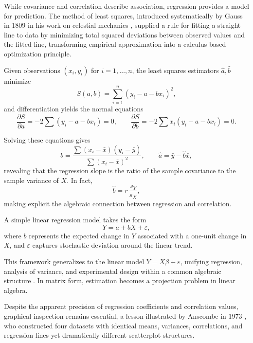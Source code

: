 \medskip

While covariance and correlation describe association, regression provides a model for prediction. The method of least squares, introduced systematically by Gauss in 1809 in his work on celestial mechanics \cite{gauss_1809_theoria}, supplied a rule for fitting a straight line to data by minimizing total squared deviations between observed values and the fitted line, transforming empirical approximation into a calculus-based optimization principle.

\medskip

Given observations \((x_i,y_i)\) for \(i=1,\dots,n\), the least squares estimators \(\hat{a},\hat{b}\) minimize 
\[
    S(a,b)=\sum_{i=1}^{n}(y_i-a-bx_i)^2,
\]
and differentiation yields the normal equations
\[
    \frac{\partial S}{\partial a}= -2\sum (y_i-a-bx_i)=0, \qquad \frac{\partial S}{\partial b}= -2\sum x_i(y_i-a-bx_i)=0.
\]

\medskip

Solving these equations gives
\[
    \hat{b}=\frac{\sum (x_i-\bar{x})(y_i-\bar{y})}{\sum (x_i-\bar{x})^2}, \qquad \hat{a}=\bar{y}-\hat{b}\bar{x},
\]
revealing that the regression slope is the ratio of the sample covariance to the sample variance of \(X\). In fact,
\[
    \hat{b}= r\,\frac{s_Y}{s_X},
\]
making explicit the algebraic connection between regression and correlation.

\medskip

A simple linear regression model takes the form
\[
Y = a + bX + \varepsilon,
\]
where \(b\) represents the expected change in \(Y\) associated with a one-unit change in \(X\), and \(\varepsilon\) captures stochastic deviation around the linear trend.

\medskip

This framework generalizes to the linear model \(Y = X\beta + \varepsilon\), unifying regression, analysis of variance, and experimental design within a common algebraic structure \cite{fisher_1925_statistical,fisher_1935_design}. In matrix form, estimation becomes a projection problem in linear algebra.

\medskip

Despite the apparent precision of regression coefficients and correlation values, graphical inspection remains essential, a lesson illustrated by Anscombe in 1973 \cite{anscombe_1973_graphs}, who constructed four datasets with identical means, variances, correlations, and regression lines yet dramatically different scatterplot structures.


